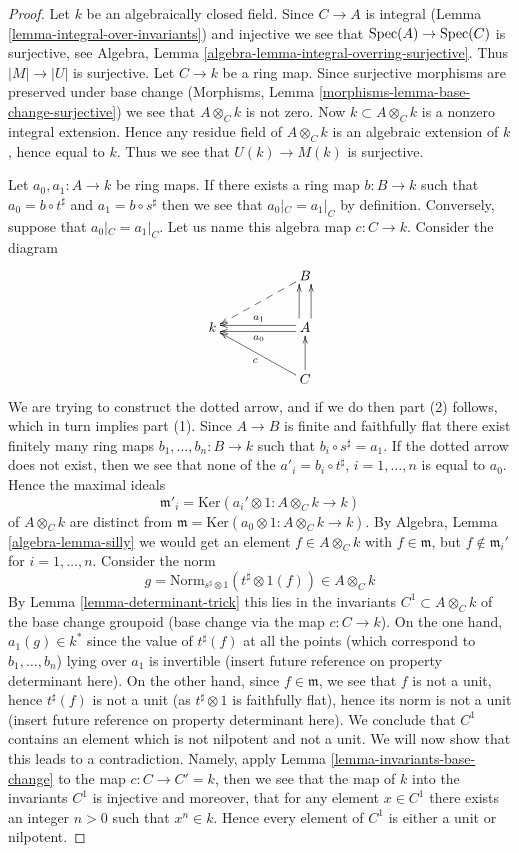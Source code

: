 \begin{proof}
Let $k$ be an algebraically closed field.
Since $C \to A$ is integral (Lemma \ref{lemma-integral-over-invariants})
and injective we see that
$\mathop{\rm Spec}(A) \to \mathop{\rm Spec}(C)$ is surjective, see
Algebra, Lemma \ref{algebra-lemma-integral-overring-surjective}.
Thus $|M| \to |U|$ is surjective.
Let $C \to k$ be a ring map. Since surjective morphisms are
preserved under base change
(Morphisms, Lemma \ref{morphisms-lemma-base-change-surjective}) we see that
$A \otimes_C k$ is not zero. Now $k \subset A \otimes_C k$ is a
nonzero integral extension. Hence any residue field of $A \otimes_C k$
is an algebraic extension of $k$, hence equal to $k$. Thus we see that
$U(k) \to M(k)$ is surjective.

\medskip\noindent
Let $a_0, a_1 : A \to k$ be ring maps. If there exists a ring map
$b : B \to k$ such that $a_0 = b \circ t^\sharp$ and $a_1 = b \circ s^\sharp$
then we see that $a_0|_C = a_1|_C$ by definition.
Conversely, suppose that $a_0|_C = a_1|_C$. Let us name this algebra
map $c : C \to k$. Consider the diagram
$$
\xymatrix{
& &
B \ar@{-->}[lld] \\
k & &
A
\ar@<0.5ex>[ll]^{a_0}
\ar@<-0.5ex>[ll]_{a_1}
\ar@<1ex>[u]
\ar@<-1ex>[u] \\
& &
C \ar[u] \ar[llu]^c
}
$$
We are trying to construct the dotted arrow, and if we do then
part (2) follows, which in turn implies part (1).
Since $A \to B$ is finite and faithfully flat
there exist finitely many ring maps
$b_1, \ldots, b_n : B \to k$ such that $b_i \circ s^\sharp = a_1$.
If the dotted arrow does not exist, then we see that none of the
$a'_i = b_i \circ t^\sharp$, $i = 1, \ldots, n$ is equal to $a_0$.
Hence the maximal ideals
$$
\mathfrak m'_i = \text{Ker}(a_i' \otimes 1 : A \otimes_C k \to k)
$$
of $A \otimes_C k$ are distinct from
$\mathfrak m = \text{Ker}(a_0 \otimes 1 : A \otimes_C k \to k)$.
By Algebra, Lemma \ref{algebra-lemma-silly} we would get an element
$f \in A \otimes_C k$ with $f \in \mathfrak m$, but
$f \not \in \mathfrak m_i'$ for $i = 1, \ldots, n$.
Consider the norm
$$
g = \text{Norm}_{s^\sharp \otimes 1}(t^\sharp \otimes 1(f))
\in
A \otimes_C k
$$
By Lemma \ref{lemma-determinant-trick} this lies in the invariants
$C^1 \subset A \otimes_C k$ of the base change
groupoid (base change via the map $c : C \to k$). On the one hand,
$a_1(g) \in k^*$ since
the value of $t^\sharp(f)$ at all the points (which correspond to
$b_1, \ldots, b_n$) lying over $a_1$ is
invertible (insert future reference on property determinant here).
On the other hand, since $f \in \mathfrak m$, we see that
$f$ is not a unit, hence $t^\sharp(f)$ is not a unit
(as $t^\sharp \otimes 1$ is faithfully flat),
hence its norm is not a unit (insert future reference
on property determinant here). We conclude that $C^1$ contains
an element which is not nilpotent
and not a unit. We will now show that this leads to a contradiction.
Namely, apply Lemma \ref{lemma-invariants-base-change}
to the map $c : C \to C' = k$, then
we see that the map of $k$ into the invariants $C^1$ is injective
and moreover, that for any element $x \in C^1$ there exists an integer
$n > 0$ such that $x^n \in k$. Hence every element of $C^1$ is
either a unit or nilpotent.
\end{proof}

